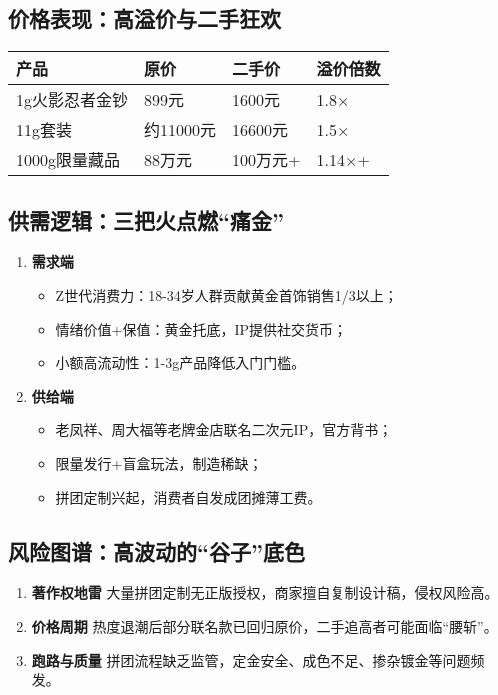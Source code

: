 \subsection{价格表现：高溢价与二手狂欢}
\begin{longtable}{@{}llll@{}}
\toprule
产品 & 原价 & 二手价 & 溢价倍数 \\ \midrule
1g火影忍者金钞 & 899元 & 1600元 & 1.8× \\
11g套装 & 约11000元 & 16600元 & 1.5× \\
1000g限量藏品 & 88万元 & 100万元+ & 1.14×+ \\ \bottomrule
\end{longtable}

\subsection{供需逻辑：三把火点燃“痛金”}
\begin{enumerate}[leftmargin=*, nosep]
    \item \textbf{需求端}  
    \begin{itemize}[nosep]
        \item Z世代消费力：18-34岁人群贡献黄金首饰销售1/3以上；
        \item 情绪价值+保值：黄金托底，IP提供社交货币；
        \item 小额高流动性：1-3g产品降低入门门槛。
    \end{itemize}
    \item \textbf{供给端}  
    \begin{itemize}[nosep]
        \item 老凤祥、周大福等老牌金店联名二次元IP，官方背书；
        \item 限量发行+盲盒玩法，制造稀缺；
        \item 拼团定制兴起，消费者自发成团摊薄工费。
    \end{itemize}
\end{enumerate}

\subsection{风险图谱：高波动的“谷子”底色}
\begin{enumerate}[leftmargin=*, nosep]
    \item \textbf{著作权地雷}  
    大量拼团定制无正版授权，商家擅自复制设计稿，侵权风险高。
    \item \textbf{价格周期}  
    热度退潮后部分联名款已回归原价，二手追高者可能面临“腰斩”。
    \item \textbf{跑路与质量}  
    拼团流程缺乏监管，定金安全、成色不足、掺杂镀金等问题频发。
\end{enumerate}

